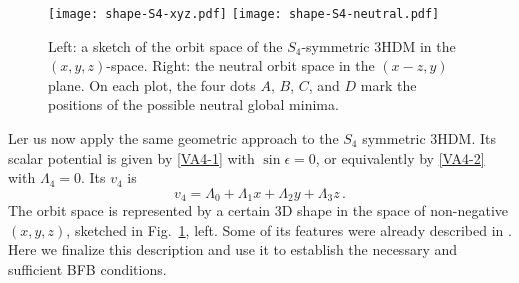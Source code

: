 \documentclass[11pt]{article}
\begin{document}
\begin{figure} [ht]
	\centering
	\texttt{[image: shape-S4-xyz.pdf]}\hspace{5mm}
	\texttt{[image: shape-S4-neutral.pdf]}
	\caption{Left: a sketch of the orbit space of the $S_4$-symmetric 3HDM in the $(x,y,z)$-space. Right: the neutral orbit space
		in the $(x-z,y)$ plane. On each plot, the four dots $A$, $B$, $C$, and $D$ mark the positions of the possible neutral global minima.}
	\label{fig-S4-orbit}
\end{figure}

Ler us now apply the same geometric approach to the $S_4$ symmetric 3HDM.
Its scalar potential is given by \eqref{VA4-1} with $\sin\epsilon = 0$,
or equivalently by \eqref{VA4-2} with $\Lambda_4 = 0$.
Its $v_4$ is
\begin{equation}
v_4 = \Lambda_{0} + \Lambda_{1} x + \Lambda_2 y + \Lambda_3 z\,.\label{v4-S4}
\end{equation}
The orbit space is represented by a certain 3D shape in the space of non-negative $(x, y, z)$,
sketched in Fig.~\ref{fig-S4-orbit}, left. 
Some of its features were already described in \cite{Degee:2012sk}. 
Here we finalize this description and 
use it to establish the necessary and sufficient BFB conditions. 
\end{document}
